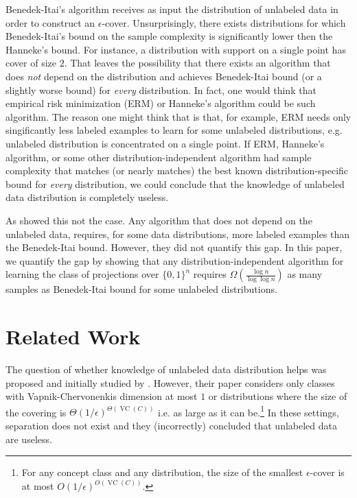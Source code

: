 \documentclass[10pt]{article}
\DeclareMathOperator{\VC}{VC}
\begin{document}
Benedek-Itai's algorithm receives as input the distribution of unlabeled data in
order to construct an $\epsilon$-cover. Unsurprisingly, there exists
distributions for which Benedek-Itai's bound on the sample complexity is
significantly lower then the Hanneke's bound. For instance, a distribution with
support on a single point has cover of size $2$. That leaves the possibility
that there exists an algorithm that does \emph{not} depend on the distribution
and achieves Benedek-Itai bound (or a slightly worse bound) for \emph{every}
distribution. In fact, one would think that empirical risk minimization (ERM) or
Hanneke's algorithm could be such algorithm. The reason one might think that is
that, for example, ERM needs only singificantly less labeled examples to learn
for some unlabeled distributions, e.g. unlabeled distribution is concentrated on
a single point. If ERM, Hanneke's algorithm, or some other
distribution-independent algorithm had sample complexity that matches (or nearly
matches) the best known distribution-specific bound for \emph{every}
distribution, we could conclude that the knowledge of unlabeled data
distribution is completely useless.

As \cite{Darnstadt-Simon-Szorenyi-2013} showed this not the case. Any algorithm
that does not depend on the unlabeled data, requires, for some data
distributions, more labeled examples than the Benedek-Itai bound. However, they
did not quantify this gap. In this paper, we quantify the gap by showing that
any distribution-independent algorithm for learning the class of projections
over $\{0,1\}^n$ requires $\Omega(\frac{\log n}{\log \log n})$ as many samples
as Benedek-Itai bound for some unlabeled distributions.

\section{Related Work}

The question of whether knowledge of unlabeled data distribution helps was
proposed and initially studied by \cite{Ben-David-Lu-Pal-2008}. However, their
paper considers only classes with Vapnik-Chervonenkis dimension at most $1$
or distributions where the size of the covering is
$\Theta(1/\epsilon)^{\Theta(\VC(C))}$ i.e. as large as it can be.\footnote{For
any concept class and any distribution, the size of the smallest
$\epsilon$-cover is at most $O(1/\epsilon)^{O(\VC(C))}$.} In these settings,
separation does not exist and they (incorrectly) concluded that unlabeled data
are useless.
\end{document}
